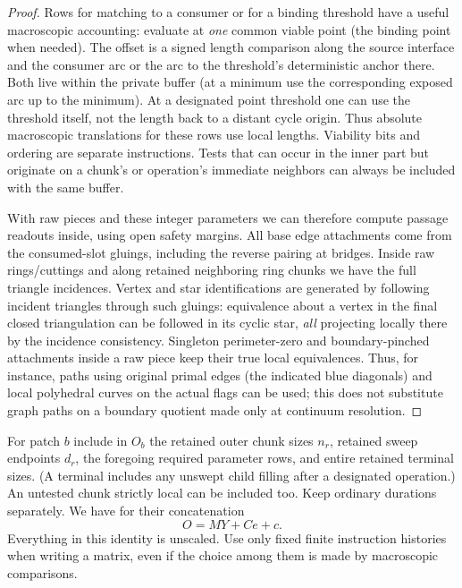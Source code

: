 \begin{proof}
Rows for matching to a consumer or for a binding threshold have a useful macroscopic accounting:
evaluate at \emph{one} common viable point (the binding point when needed). The offset is a signed length
comparison along the source interface and the consumer arc or the arc to the threshold's deterministic
anchor there. Both live within the private buffer (at a minimum use the corresponding exposed arc up to the
minimum). At a designated point threshold one can use the threshold itself, not the length back to a distant
cycle origin. Thus absolute macroscopic translations for these rows use local lengths. Viability bits and
ordering are separate instructions. Tests that can occur in the inner part but originate on a chunk's or
operation's immediate neighbors can always be included with the same buffer.

With raw pieces and these integer parameters we can therefore compute passage readouts inside, using open
safety margins. All base edge attachments come from the consumed-slot gluings, including the reverse pairing
at bridges. Inside raw rings/cuttings and along retained neighboring ring chunks we have the full triangle
incidences. Vertex and star identifications are generated by following incident triangles through such
gluings: equivalence about a vertex in the final closed triangulation can be followed in its cyclic star,
\emph{all} projecting locally there by the incidence consistency. Singleton perimeter-zero and
boundary-pinched attachments inside a raw piece keep their true local equivalences. Thus, for instance,
paths using original primal edges (the indicated blue diagonals) and local polyhedral curves on the actual
flags can be used; this does not substitute graph paths on a boundary quotient made only at continuum
resolution.

\end{proof}

\begin{definition}\label{kern:projected-parameters}

For patch \(b\) include in \(O_b\) the retained outer chunk sizes \(n_r\), retained sweep endpoints \(d_r\),
the foregoing required parameter rows, and entire retained terminal sizes. (A terminal includes any unswept
child filling after a designated operation.) An untested chunk strictly local can be included too. Keep
ordinary durations separately. We have for their concatenation
\begin{equation}\label{eq:original-14}
O=M Y + C e + c.
\end{equation}
Everything in this identity is unscaled. Use only fixed finite instruction histories when writing a matrix,
even if the choice among them is made by macroscopic comparisons.

\end{definition}

